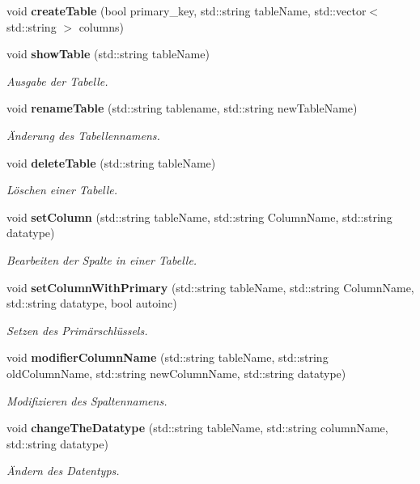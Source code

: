 \begin{DoxyCompactItemize}
\item 
void \textbf{ create\+Table} (bool primary\+\_\+key, std\+::string table\+Name, std\+::vector$<$ std\+::string $>$ columns)
\item 
void \textbf{ show\+Table} (std\+::string table\+Name)
\begin{DoxyCompactList}\small\item\em Ausgabe der Tabelle. \end{DoxyCompactList}\item 
void \textbf{ rename\+Table} (std\+::string tablename, std\+::string new\+Table\+Name)
\begin{DoxyCompactList}\small\item\em Änderung des Tabellennamens. \end{DoxyCompactList}\item 
void \textbf{ delete\+Table} (std\+::string table\+Name)
\begin{DoxyCompactList}\small\item\em Löschen einer Tabelle. \end{DoxyCompactList}\item 
void \textbf{ set\+Column} (std\+::string table\+Name, std\+::string Column\+Name, std\+::string datatype)
\begin{DoxyCompactList}\small\item\em Bearbeiten der Spalte in einer Tabelle. \end{DoxyCompactList}\item 
void \textbf{ set\+Column\+With\+Primary} (std\+::string table\+Name, std\+::string Column\+Name, std\+::string datatype, bool autoinc)
\begin{DoxyCompactList}\small\item\em Setzen des Primärschlüssels. \end{DoxyCompactList}\item 
void \textbf{ modifier\+Column\+Name} (std\+::string table\+Name, std\+::string old\+Column\+Name, std\+::string new\+Column\+Name, std\+::string datatype)
\begin{DoxyCompactList}\small\item\em Modifizieren des Spaltennamens. \end{DoxyCompactList}\item 
void \textbf{ change\+The\+Datatype} (std\+::string table\+Name, std\+::string column\+Name, std\+::string datatype)
\begin{DoxyCompactList}\small\item\em Ändern des Datentyps. \end{DoxyCompactList}\item 

\end{DoxyCompactItemize}
